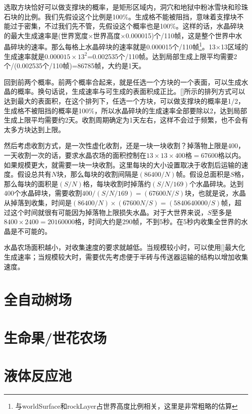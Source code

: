 选取方块恰好可以做支撑块的概率，是矩形区域内，洞穴和地狱中粉冰雪块和珍珠石块的比例。我们先假设这个比例是100\%。生成格不能被阻挡，意味着支撑块不能过于密集，不过我们先不管，先假设这个概率也是100\%。这样的话，水晶碎块的最大生成速率是(世界宽度$\times$世界高度$\times$0.000015)个/110帧，这是整个世界中水晶碎块的速率。那么每格上水晶碎块的速率就是0.000015个/110帧\footnote{与worldSurface和rockLayer占世界高度比例相关，这里是非常粗略的估算}。13$\times$13区域的生成速率就是$0.000015\times 13^2$=0.002535个/110帧。达到局部生成上限平均需要2个/(0.002535个/110帧)=86785帧，大约是1天。

回到前两个概率。前两个概率合起来，就是任选一个方块的一个表面，可以生成水晶的概率。换句话说，生成速率与可生成的表面积成正比。\autoref{}所示的排列方式可以达到最大的表面积，在这个排列下，任选一个方块，可以做支撑块的概率是1/2，生成格不被阻挡的概率是100\%，所以水晶碎块的生成速率全部要除以2，达到局部生成上限平均需要约2天。收割周期确定为1天左右，这样不会过于频繁，也不会有太多方块达到上限。

然后考虑收割方式，是一次性虚化收割，还是一块一块收割？掉落物上限是400，一天收割一次的话，要求水晶农场的面积控制在$13\times 13\times 400\textrm{格}=67600$格以内。如果规模更大，就需要一块一块收割。这里每块的大小设置取决于收割后运输的速度。假设总共有$N$块，那么每块的收割间隔是$(86400/N)$帧。假设总面积是$S$格，那么每块的面积是$(S/N)$格，每块收割时掉落约$(S/N/169)$个水晶碎块。达到400个水晶碎块，需要收割$400/(S/N/169)=(67600N/S)$块，也就是说，水晶从掉落到收集，时间是$(86400/N)\times(67600N/S)=(5840640000/S)$帧，超过这个时间就很有可能因为掉落物上限损失水晶。对于大世界来说，$S$至多是$8400\times2400=20160000$格，时间大约是290帧，不到5秒。在5秒内收集全世界的水晶是不可能的。

水晶农场面积越小，对收集速度的要求就越低。当规模较小时，可以使用\autoref{}最大化生成速率；当规模较大时，需要优先考虑便于半砖与传送器运输的结构以增加收集速度。

\section{全自动树场}

\section{生命果/世花农场}

\section{液体反应池}

